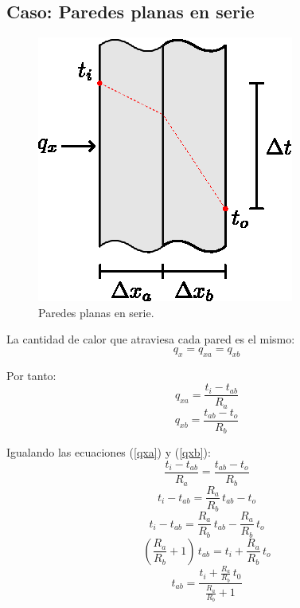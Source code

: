 \subsection{Caso: Paredes planas en serie}
\begin{figure}[!h]
\centering
\includegraphics[scale=1.20]{figura02_06.eps}
\caption{Paredes planas en serie.}
\end{figure}

La cantidad de calor que atraviesa cada pared es el mismo:
\begin{equation}
    q_x=q_{xa}=q_{xb}
\end{equation}

Por tanto:
\begin{equation}
    q_{xa}=\frac{t_i-t_{ab}}{R_a}
    \label{qxa}
\end{equation}
\begin{equation}
    q_{xb}=\frac{t_{ab}-t_o}{R_b}
    \label{qxb}
\end{equation}

Igualando las ecuaciones (\ref{qxa}) y (\ref{qxb}):
\begin{equation*}
    \frac{t_i-t_{ab}}{R_a}=\frac{t_{ab}-t_o}{R_b}
\end{equation*}
\begin{equation*}
    t_i-t_{ab}=\frac{R_a}{R_b}\,t_{ab}-t_o
\end{equation*}
\begin{equation*}
    t_i-t_{ab}=\frac{R_a}{R_b}\,t_{ab}-\frac{R_a}{R_b}\,t_o
\end{equation*}
\begin{equation*}
    \left(\frac{R_a}{R_b}+1\right)\,t_{ab}=t_i+\frac{R_a}{R_b}\,t_o
\end{equation*}
\begin{equation}
    t_{ab}=\dfrac{t_i+\frac{R_a}{R_b}\,t_0}{\frac{R_a}{R_b}+1}
    \label{tab}
\end{equation}

